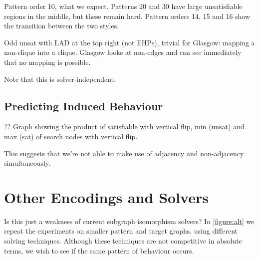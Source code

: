 \documentclass[letterpaper]{article}
\begin{document}
Pattern order 10, what we expect. Patterns 20 and 30 have large unsatisfiable regions in the middle,
but these remain hard. Pattern orders 14, 15 and 16 show the transition between the two styles.

Odd unsat with LAD at the top right (not EHPs), trivial for Glasgow: mapping a non-clique into a
clique. Glasgow looks at non-edges and can see immediately that no mapping is possible.

Note that this is solver-independent.

\begin{figure*}[t]
    
    \caption{Behaviour of algorithms on the induced variant, shown in the style
    of \cref{figure:non-induced}. The second row shows a bound on the satisfiable region, by
    considering where a \emph{non-}induced isomorphism may also be a non-induced isomorphism between
    complement graphs.}\label{figure:induced}
\end{figure*}

\subsection{Predicting Induced Behaviour}

?? Graph showing the product of satisfiable with vertical flip, min (unsat) and max (sat) of search
nodes with vertical flip.

This suggests that we're not able to make use of adjacency and non-adjacency simultaneously.

\section{Other Encodings and Solvers}

\begin{figure*}[t]
    
    \caption{Behaviour of other solvers on the induced variant on smaller graphs, shown in the style of
        \cref{figure:non-induced}. The second row shows the number of search nodes used by the Glasgow
        algorithm, the third row shows the number of decisions made by the Clasp pseudo-boolean solver,
        the fourth row shows the number of search nodes used by a clique encoding, and the fifth a mixed
        integer encoding with Gurobi.}\label{figure:alt}
\end{figure*}

Is this just a weakness of current subgraph isomorphism solvers? In \cref{figure:alt} we repeat the
experiments on smaller pattern and target graphs, using different solving techniques. Although these
techniques are not competitive in absolute terms, we wish to see if the same pattern of behaviour
occurs.
\end{document}
